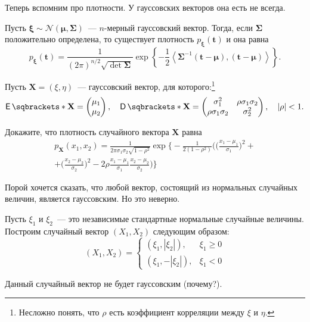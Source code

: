 Теперь вспомним про плотности. У гауссовских векторов она есть не всегда.

\begin{theorem}
	Пусть \(\bm{\xi} \sim \mathcal{N}(\bm{\mu}, \mathbf{\Sigma})\)~--- 
	\(n\)-мерный гауссовский вектор. Тогда, если \(\mathbf{\Sigma}\) 
	положительно определена, то существует плотность 
	\(p_{\bm{\xi}}(\mathbf{t})\) и она равна
	\[
	p_{\bm{\xi}}(\mathbf{t}) = \frac{1}{(2\pi)^{n/2} 
	\sqrt{\det{\mathbf{\Sigma}}}} \exp\left\{-\frac{1}{2} 
	\left\langle\mathbf{\Sigma}^{-1}(\mathbf{t}
	- \bm{\mu}), (\mathbf{t} - \bm{\mu})\right\rangle\right\}.
	\]
\end{theorem}
\begin{problem}\label{bivariate-normal-density}
	Пусть \(\mathbf{X} = (\xi, \eta)\)~--- гауссовский вектор, для 
	которого:\footnote{Несложно понять, что \(\rho\) есть коэффициент 
	корреляции между \(\xi\) и \(\eta\).}
	\[
		\E{\mathbf{X}} = \begin{pmatrix}\mu_{1} \\ \mu_{2}\end{pmatrix}, \quad
		\D{\mathbf{X}} =
		\begin{pmatrix}
		\sigma_{1}^{2} & \rho\sigma_{1}\sigma_{2} \\
		\rho\sigma_{1}\sigma_{2} & \sigma_{2}^{2}
		\end{pmatrix}, \quad |\rho| < 1.
	\]
	
	Докажите, что плотность случайного вектора \(\mathbf{X}\) равна
	\begin{multline*}
		p_{\mathbf{X}}(x_{1}, x_{2}) = \frac{1}{2\pi\sigma_{1}\sigma_{2}\sqrt{1 
		- \rho^{2}}}\exp\bigg\{-\frac{1}{2(1 - \rho^{2})} 
		\bigg(\bigg(\frac{x_{1} - \mu_{1}}{\sigma_{1}}\bigg)^{2} + \\ +
		\bigg(\frac{x_{2} - \mu_{2}}{\sigma_{2}}\bigg)^{2} - 2\rho\frac{x_{1} - 
		\mu_{1}}{\sigma_{1}}\frac{x_{2} - \mu_{2}}{\sigma_{2}}\bigg)\bigg\}
	\end{multline*}
\end{problem}

Порой хочется сказать, что любой вектор, состоящий из нормальных случайных 
величин, является гауссовским. Но это неверно.

\begin{example}
	Пусть \(\xi_{1}\) и \(\xi_{2}\)~--- это независимые стандартные нормальные 
	случайные величины. Построим случайный вектор \((X_{1}, X_{2})\) следующим 
	образом:
	\[
		(X_{1}, X_{2}) = \begin{cases}
		(\xi_{1}, |\xi_{2}|),& \xi_{1} \geq 0 \\
		(\xi_{1}, -|\xi_{2}|),& \xi_{1} < 0
		\end{cases}
	\] 
	
	Данный случайный вектор не будет гауссовским (почему?).
\end{example}

